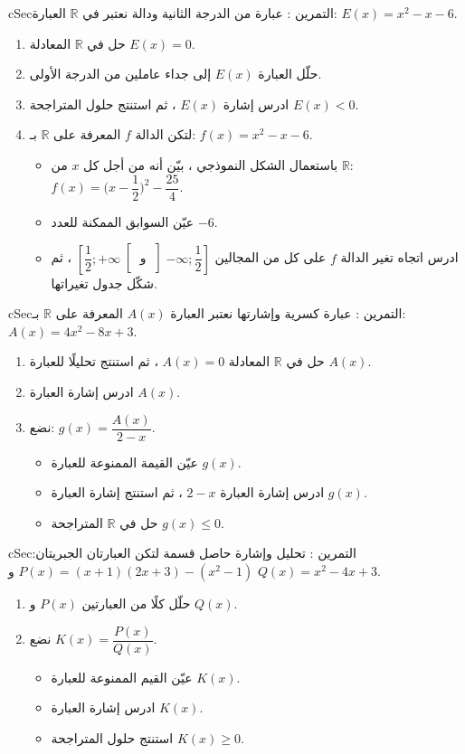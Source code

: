 \documentclass[12pt,a4paper]{article}
\newenvironment{BOX}[2]{\begin{otherlanguage}{english}\begin{arbox}{#1}{#2}}{\end{arbox}\end{otherlanguage}}
\newcounter{exo}
\newenvironment{tamrin}[1]{\stepcounter{exo}\begin{BOX}{cSec}{التمرين \theexo: #1}}{\end{BOX}}
\newcommand{\R}{\mathbb{R}}
\newenvironment{sq}{\begin{itemize}[leftmargin=2.4em,itemsep=3pt]}{\end{itemize}}
\newcommand{\qa}{\item[(أ)]}\newcommand{\qb}{\item[(ب)]}\newcommand{\qc}{\item[(جـ)]}\newcommand{\qd}{\item[(د)]}\newcommand{\qe}{\item[(هـ)]}
\begin{document}
\begin{tamrin}{عبارة من الدرجة الثانية ودالة}
نعتبر في $\R$ العبارة: $E(x)=x^2-x-6$.
\begin{enumerate}
\item حل في $\R$ المعادلة $E(x)=0$.
\item حلّل العبارة $E(x)$ إلى جداء عاملين من الدرجة الأولى.
\item ادرس إشارة $E(x)$ ، ثم استنتج حلول المتراجحة $E(x)<0$.
\item لتكن الدالة $f$ المعرفة على $\R$ بـ: $f(x)=x^2-x-6$.
\begin{sq}
\qa باستعمال الشكل النموذجي ، بيّن أنه من أجل كل $x$ من $\R$: $f(x)=\Big(x-\dfrac12\Big)^2-\dfrac{25}4$.
\qb عيّن السوابق الممكنة للعدد $-6$.
\qc ادرس اتجاه تغير الدالة $f$ على كل من المجالين $\left]-\infty;\dfrac12\right]$ و $\left[\dfrac12;+\infty\right[$ ، ثم شكّل جدول تغيراتها.
\end{sq}
\end{enumerate}
\end{tamrin}

\begin{tamrin}{عبارة كسرية وإشارتها}
نعتبر العبارة $A(x)$ المعرفة على $\R$ بـ: $A(x)=4x^2-8x+3$.
\begin{enumerate}
\item حل في $\R$ المعادلة $A(x)=0$ ، ثم استنتج تحليلًا للعبارة $A(x)$.
\item ادرس إشارة العبارة $A(x)$.
\item نضع: $g(x)=\dfrac{A(x)}{2-x}$.
\begin{sq}
\qa عيّن القيمة الممنوعة للعبارة $g(x)$.
\qb ادرس إشارة العبارة $2-x$ ، ثم استنتج إشارة العبارة $g(x)$.
\qc حل في $\R$ المتراجحة $g(x)\leqslant0$.
\end{sq}
\end{enumerate}
\end{tamrin}

\begin{tamrin}{تحليل وإشارة حاصل قسمة}
لتكن العبارتان الجبريتان: $P(x)=(x+1)(2x+3)-\left(x^2-1\right)$ و $Q(x)=x^2-4x+3$.
\begin{enumerate}
\item حلّل كلًا من العبارتين $P(x)$ و $Q(x)$.
\item نضع $K(x)=\dfrac{P(x)}{Q(x)}$.
\begin{sq}
\qa عيّن القيم الممنوعة للعبارة $K(x)$.
\qb ادرس إشارة العبارة $K(x)$.
\qc استنتج حلول المتراجحة $K(x)\geqslant0$.
\end{sq}
\end{enumerate}
\end{tamrin}
\end{document}

